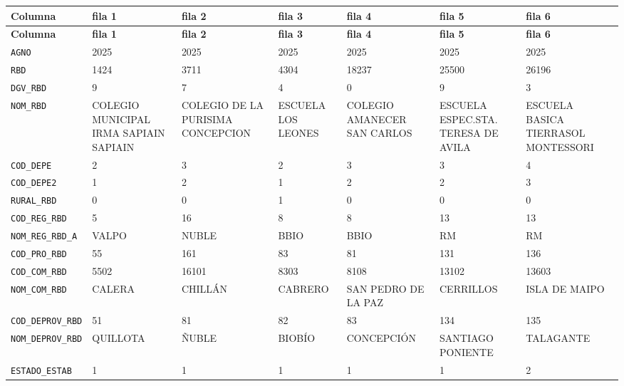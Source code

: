 \documentclass[10pt]{article}
\newcommand{\hdr}[1]{\textbf{\color{white}#1}}
\begin{document}
\footnotesize
\begin{xltabular}{\linewidth}{@{}p{4.3cm} Y Y Y Y Y Y @{}}
\hdr{Columna} & \hdr{fila 1} & \hdr{fila 2} & \hdr{fila 3} & \hdr{fila 4} & \hdr{fila 5} & \hdr{fila 6} \\
\endfirsthead
{}\hdr{Columna} & \hdr{fila 1} & \hdr{fila 2} & \hdr{fila 3} & \hdr{fila 4} & \hdr{fila 5} & \hdr{fila 6} \\
\endhead
{}\texttt{AGNO} & 2025 & 2025 & 2025 & 2025 & 2025 & 2025 \\
\texttt{RBD} & 1424 & 3711 & 4304 & 18237 & 25500 & 26196 \\
\texttt{DGV\_\allowbreak{}RBD} & 9 & 7 & 4 & 0 & 9 & 3 \\
\texttt{NOM\_\allowbreak{}RBD} & COLEGIO MUNICIPAL IRMA SAPIAIN SAPIAIN & COLEGIO DE LA PURISIMA CONCEPCION & ESCUELA LOS LEONES & COLEGIO AMANECER SAN CARLOS & ESCUELA ESPEC.STA. TERESA DE AVILA & ESCUELA BASICA TIERRASOL MONTESSORI \\
\texttt{COD\_\allowbreak{}DEPE} & 2 & 3 & 2 & 3 & 3 & 4 \\
\texttt{COD\_\allowbreak{}DEPE2} & 1 & 2 & 1 & 2 & 2 & 3 \\
\texttt{RURAL\_\allowbreak{}RBD} & 0 & 0 & 1 & 0 & 0 & 0 \\
\texttt{COD\_\allowbreak{}REG\_\allowbreak{}RBD} & 5 & 16 & 8 & 8 & 13 & 13 \\
\texttt{NOM\_\allowbreak{}REG\_\allowbreak{}RBD\_\allowbreak{}A} & VALPO & NUBLE & BBIO & BBIO & RM & RM \\
\texttt{COD\_\allowbreak{}PRO\_\allowbreak{}RBD} & 55 & 161 & 83 & 81 & 131 & 136 \\
\texttt{COD\_\allowbreak{}COM\_\allowbreak{}RBD} & 5502 & 16101 & 8303 & 8108 & 13102 & 13603 \\
\texttt{NOM\_\allowbreak{}COM\_\allowbreak{}RBD} & CALERA & CHILLÁN & CABRERO & SAN PEDRO DE LA PAZ & CERRILLOS & ISLA DE MAIPO \\
\texttt{COD\_\allowbreak{}DEPROV\_\allowbreak{}RBD} & 51 & 81 & 82 & 83 & 134 & 135 \\
\texttt{NOM\_\allowbreak{}DEPROV\_\allowbreak{}RBD} & QUILLOTA & ÑUBLE & BIOBÍO & CONCEPCIÓN & SANTIAGO PONIENTE & TALAGANTE \\
\texttt{ESTADO\_\allowbreak{}ESTAB} & 1 & 1 & 1 & 1 & 1 & 2 \\

\end{xltabular}
\end{document}
